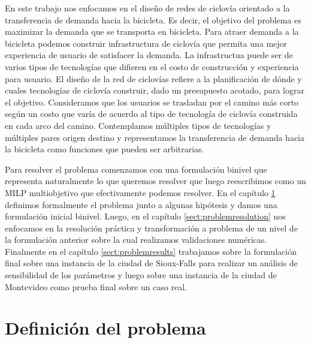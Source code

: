 \documentclass{article}
\begin{document}
  En este trabajo nos enfocamos en el diseño de redes de ciclovía orientado a la transferencia de demanda hacia la bicicleta. Es decir, el objetivo del problema es maximizar la demanda que se transporta en bicicleta. Para atraer demanda a la bicicleta podemos construir infrastructura de ciclovía que permita una mejor experiencia de usuario de satisfacer la demanda. La infrastructua puede ser de varios tipos de tecnologías que difieren en el costo de construcción y experiencia para usuario. El diseño de la red de ciclovías refiere a la planificación de dónde y cuales tecnologías de ciclovía construir, dado un presupuesto acotado, para lograr el objetivo. Consideramos que los usuarios se trasladan por el camino más corto según un costo que varía de acuerdo al tipo de tecnología de ciclovía construida en cada arco del camino. Contemplamos múltiples tipos de tecnologías y múltiples pares origen destino y representamos la transferencia de demanda hacia la bicicleta como funciones que pueden ser arbitrarias.

  Para resolver el problema comenzamos con una formulación binivel que representa naturalmente lo que queremos resolver que luego reescribimos como un MILP multiobjetivo que efectivamente podemos resolver. En el capítulo \ref{sect:problemdefinition} definimos formalmente el problema junto a algunas hipótesis y damos una formulación inicial binivel. Luego, en el capítulo \ref{sect:problemresolution} nos enfocamos en la resolución práctica y transformación a problema de un nivel de la formulación anterior sobre la cual realizamos validaciones numéricas. Finalmente en el capítulo \ref{sect:problemresults} trabajamos sobre la formulación final sobre una instancia de la ciudad de Sioux-Falls para realizar un análisis de sensibilidad de los parámetros y luego sobre una instancia de la ciudad de Montevideo como prueba final sobre un caso real.

  \section{Definición del problema}
  \label{sect:problemdefinition}
\end{document}
